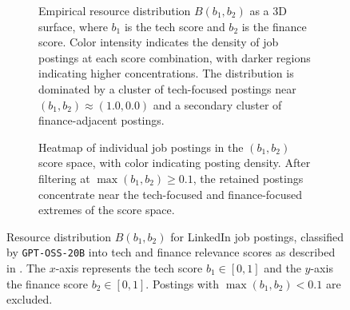 \documentclass{article}
\begin{document}
        \begin{figure}[ht!]
            \centering
            \begin{subfigure}[b]{0.45\linewidth}
                \centering
                
                \caption{Empirical resource distribution $B(b_1, b_2)$ as a 3D surface, where $b_1$ is the tech score and $b_2$ is the finance score.
                    Color intensity indicates the density of job postings at each score combination, with darker regions indicating higher concentrations.
                    The distribution is dominated by a cluster of tech-focused postings near $(b_1, b_2) \approx (1.0, 0.0)$ and a secondary cluster of finance-adjacent postings.}
                \label{fig:linkedin_resources:a}
                \vspace{4ex}
            \end{subfigure}
            \hspace{4ex}
            \begin{subfigure}[b]{0.45\linewidth}
                \centering
                
                \caption{Heatmap of individual job postings in the $(b_1, b_2)$ score space, with color indicating posting density.
                    After filtering at $\max(b_1,b_2) \geq 0.1$, the retained postings concentrate near the tech-focused and finance-focused extremes of the score space.}
                \label{fig:linkedin_resources:b}
                \vspace{4ex}
            \end{subfigure}
            \caption{Resource distribution $B(b_1,b_2)$ for LinkedIn job postings, classified by \texttt{GPT-OSS-20B} into tech and finance relevance scores as described in .
                The $x$-axis represents the tech score $b_1 \in [0,1]$ and the $y$-axis the finance score $b_2 \in [0,1]$.
                Postings with $\max(b_1,b_2) < 0.1$ are excluded.}
            \label{fig:linkedin_resources}
        \end{figure}
\end{document}
